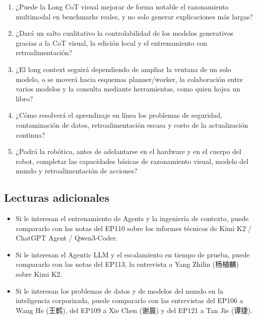 \begin{enumerate}
\item ¿Puede la Long CoT visual mejorar de forma notable el razonamiento multimodal en benchmarks reales, y no solo generar explicaciones más largas?
\item ¿Dará un salto cualitativo la controlabilidad de los modelos generativos gracias a la CoT visual, la edición local y el entrenamiento con retroalimentación?
\item ¿El long context seguirá dependiendo de ampliar la ventana de un solo modelo, o se moverá hacia esquemas planner/worker, la colaboración entre varios modelos y la consulta mediante herramientas, como quien hojea un libro?
\item ¿Cómo resolverá el aprendizaje en línea los problemas de seguridad, contaminación de datos, retroalimentación escasa y costo de la actualización continua?
\item ¿Podrá la robótica, antes de adelantarse en el hardware y en el cuerpo del robot, completar las capacidades básicas de razonamiento visual, modelo del mundo y retroalimentación de acciones?
\end{enumerate}

\subsection{Lecturas adicionales}

\begin{itemize}
\item Si le interesan el entrenamiento de Agents y la ingeniería de contexto, puede compararlo con las notas del EP110 sobre los informes técnicos de Kimi K2 / ChatGPT Agent / Qwen3-Coder.
\item Si le interesan el Agentic LLM y el escalamiento en tiempo de prueba, puede compararlo con las notas del EP113, la entrevista a Yang Zhilin (杨植麟) sobre Kimi K2.
\item Si le interesan los problemas de datos y de modelos del mundo en la inteligencia corporizada, puede compararlo con las entrevistas del EP106 a Wang He (王鹤), del EP109 a Xie Chen (谢晨) y del EP121 a Tan Jie (谭捷).
\end{itemize}


